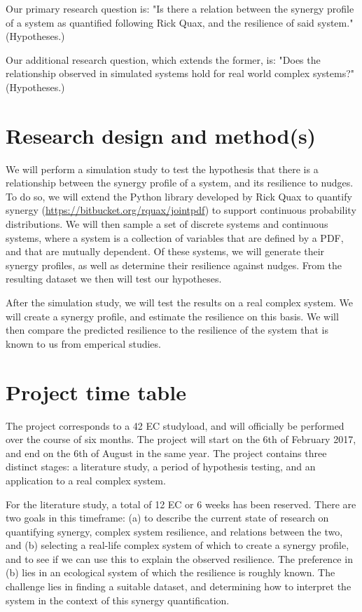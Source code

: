 \documentclass[11pt]{article}
\begin{document}
Our primary research question is: "Is there a relation between the synergy profile of a system as quantified following Rick Quax, and the resilience of said system." (Hypotheses.)


Our additional research question, which extends the former, is: "Does the relationship observed in simulated systems hold for real world complex systems?" (Hypotheses.)

\section{Research design and method(s)}

We will perform a simulation study to test the hypothesis that there is a relationship between the synergy profile of a system, and its resilience to nudges. 
To do so, we will extend the Python library developed by Rick Quax to quantify synergy (\url{https://bitbucket.org/rquax/jointpdf}) to support continuous probability distributions.
We will then sample a set of discrete systems and continuous systems, where a system is a collection of variables that are defined by a PDF, and that are mutually dependent.
Of these systems, we will generate their synergy profiles, as well as determine their resilience against nudges.
From the resulting dataset we then will test our hypotheses.

After the simulation study, we will test the results on a real complex system.
We will create a synergy profile, and estimate the resilience on this basis.
We will then compare the predicted resilience to the resilience of the system that is known to us from emperical studies.

\section{Project time table}

The project corresponds to a 42 EC studyload, and will officially be performed over the course of six months. 
The project will start on the 6th of February 2017, and end on the 6th of August in the same year.
The project contains three distinct stages: a literature study, a period of hypothesis testing, and an application to a real complex system. 

For the literature study, a total of 12 EC or 6 weeks has been reserved. 
There are two goals in this timeframe: (a) to describe the current state of research on quantifying synergy, complex system resilience, and relations between the two, and (b) selecting a real-life complex system of which to create a synergy profile, and to see if we can use this to explain the observed resilience. 
The preference in (b) lies in an ecological system of which the resilience is roughly known. 
The challenge lies in finding a suitable dataset, and determining how to interpret the system in the context of this synergy quantification.
\end{document}
